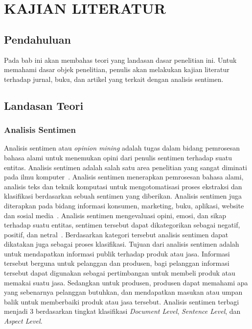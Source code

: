 \pagestyle{fancy}
\rhead{}
\setcounter{page}{1}
\chapter{KAJIAN LITERATUR}

\section{Pendahuluan}
Pada bab ini akan membahas teori yang landasan dasar penelitian ini. Untuk memahami dasar
objek penelitian, penulis akan melakukan kajian literatur terhadap jurnal, buku, dan artikel
yang terkait dengan analisis sentimen.

\section{Landasan Teori}

\subsection{Analisis Sentimen}
Analisis sentimen atau \emph{opinion mining} adalah tugas dalam bidang pemrosesan bahasa alami untuk
menemukan opini dari penulis sentimen terhadap suatu entitas. Analisis sentimen adalah salah satu
area penelitian yang sangat diminati pada ilmu komputer~\citep{Shayaa2018}. Analisis sentimen menerapkan pemrosesan bahasa alami, analisis teks dan teknik komputasi untuk
mengotomatisasi proses ekstraksi dan klasifikasi berdasarkan sebuah sentimen yang diberikan.
Analisis sentimen juga diterapkan pada bidang informasi konsumen, marketing, buku, aplikasi,
website dan sosial media~\citep{Hussein2018}. Analisis sentimen mengevaluasi opini, emosi, dan sikap terhadap suatu entitas, sentimen
tersebut dapat dikategorikan sebagai negatif, positif, dan netral~\citep{Cambria2017}. Berdasarkan
kategori tersebut analisis sentimen dapat dikatakan juga sebagai proses klasifikasi. Tujuan dari analisis sentimen adalah untuk mendapatkan informasi publik terhadap produk atau jasa.
Informasi tersebut berguna untuk pelanggan dan produsen, bagi pelanggan informasi tersebut dapat
digunakan sebagai pertimbangan untuk membeli produk atau memakai suatu jasa. Sedangkan untuk produsen,
produsen dapat memahami apa yang sebenarnya pelanggan butuhkan, dan mendapatkan masukan atau umpan balik
untuk memberbaiki produk atau jasa tersebut. Analisis sentimen terbagi menjadi 3 berdasarkan tingkat
klasifikasi \emph{Document Level}, \emph{Sentence Level}, dan \emph{Aspect Level}. \newpage



